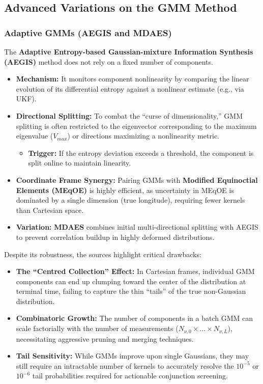 \documentclass[
  letterpaper,
  DIV=11,
  numbers=noendperiod,
  oneside]{scrartcl}
\providecommand{\tightlist}{%
  \setlength{\itemsep}{0pt}\setlength{\parskip}{0pt}}
\begin{document}
\subsection{Advanced Variations on the GMM
Method}\label{advanced-variations-on-the-gmm-method}

\subsubsection{Adaptive GMMs (AEGIS and
MDAES)}\label{adaptive-gmms-aegis-and-mdaes}

The \textbf{Adaptive Entropy-based Gaussian-mixture Information
Synthesis (AEGIS)} method does not rely on a fixed number of components.

\begin{itemize}
\item
  \textbf{Mechanism:} It monitors component nonlinearity by comparing
  the linear evolution of its differential entropy against a nonlinear
  estimate (e.g., via UKF).
\item
  \textbf{Directional Splitting:} To combat the ``curse of
  dimensionality,'' GMM splitting is often restricted to the eigenvector
  corresponding to the maximum eigenvalue (\(V_{max}\)) or directions
  maximizing a nonlinearity metric.

  \begin{itemize}
  \tightlist
  \item
    \textbf{Trigger:} If the entropy deviation exceeds a threshold, the
    component is split online to maintain linearity.
  \end{itemize}
\item
  \textbf{Coordinate Frame Synergy:} Pairing GMMs with \textbf{Modified
  Equinoctial Elements (MEqOE)} is highly efficient, as uncertainty in
  MEqOE is dominated by a single dimension (true longitude), requiring
  fewer kernels than Cartesian space.
\item
  \textbf{Variation:} \textbf{MDAES} combines initial multi-directional
  splitting with AEGIS to prevent correlation buildup in highly deformed
  distributions.
\end{itemize}

Despite its robustness, the sources highlight critical drawbacks:

\begin{itemize}
\item
  \textbf{The ``Centred Collection'' Effect:} In Cartesian frames,
  individual GMM components can end up clumping toward the center of the
  distribution at terminal time, failing to capture the thin ``tails''
  of the true non-Gaussian distribution.
\item
  \textbf{Combinatoric Growth:} The number of components in a batch GMM
  can scale factorially with the number of measurements
  (\(N_{\nu,0} \times \dots \times N_{\nu,L}\)), necessitating
  aggressive pruning and merging techniques.
\item
  \textbf{Tail Sensitivity:} While GMMs improve upon single Gaussians,
  they may still require an intractable number of kernels to accurately
  resolve the \(10^{-5}\) or \(10^{-6}\) tail probabilities required for
  actionable conjunction screening.
\end{itemize}
\end{document}

